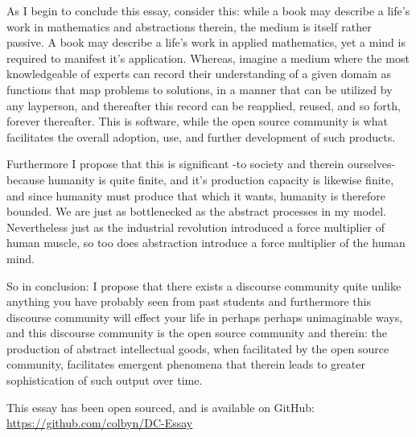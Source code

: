 \documentclass[american, 12pt]{article}
\begin{document}
As I begin to conclude this essay, consider this: while a book may describe a life’s work in mathematics and abstractions therein, the medium is itself rather passive. A book may describe a life’s work in applied mathematics, yet a mind is required to manifest it’s application. Whereas, imagine a medium where the most knowledgeable of experts can record their understanding of a given domain as functions that map problems to solutions, in a manner that can be utilized by any layperson, and thereafter this record can be reapplied, reused, and so forth, forever thereafter. This is software, while the open source community is what facilitates the overall adoption, use, and further development of such products.

Furthermore I propose that this is significant -to society and therein ourselves- because humanity is quite finite, and it’s production capacity is likewise finite, and since humanity must produce that which it wants, humanity is therefore bounded. We are just as bottlenecked as the abstract processes in my model. Nevertheless just as the industrial revolution introduced a force multiplier of human muscle, so too does abstraction introduce a force multiplier of the human mind.

So in conclusion: I propose that there exists a discourse community quite unlike anything you have probably seen from past students and furthermore this discourse community will effect your life in perhaps perhaps unimaginable ways, and this discourse community is the open source community and therein: the production of abstract intellectual goods, when facilitated by the open source community, facilitates emergent phenomena that therein leads to greater sophistication of such output over time. 

\begin{center}
This essay has been open sourced, and is available on GitHub:
\url{https://github.com/colbyn/DC-Essay}
\end{center}
\end{document}

